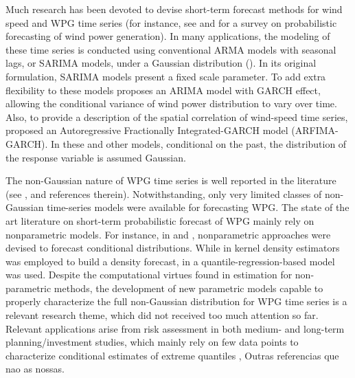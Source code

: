 \documentclass[a4paper]{IEEEtran}
\begin{document}
Much research has been devoted to devise short-term forecast methods for wind speed and WPG time series (for instance, see 
\cite{conradsen1984review, brown1984time, conejo2005forecasting,nielsen2006,pinson2007,taylor2009wind,wang2011review,bessa2012time,sideratos2012probabilistic,wan2016,gallego2016line,Xydas2017,cavalcante2017lasso,wang2017deep} 
and \cite{zhang2014review} for a survey on probabilistic forecasting of wind power generation). In many applications, the modeling of these time series is conducted using conventional ARMA models with seasonal lags, or SARIMA models, under a Gaussian distribution (\cite{FosteringWPP,souto2014high}). In its original formulation, SARIMA models present a fixed scale parameter. To add extra flexibility to these models \cite{lau2010approaches} proposes an ARIMA model with GARCH effect, allowing the conditional variance of wind power distribution to vary over time. Also, to provide a description of the spatial correlation of wind-speed time series, \cite{taylor2009wind} proposed an Autoregressive Fractionally Integrated-GARCH model (ARFIMA-GARCH). In these and other models, conditional on the past, the distribution of the response variable is assumed Gaussian.

The non-Gaussian nature of WPG time series is well reported in the literature (see \cite{bessa2012time,jeon2012using,taylor2015forecasting,Wan2017}, and references therein). Notwithstanding, only very limited classes of non-Gaussian time-series models were available for forecasting WPG. The state of the art literature on short-term probabilistic forecast of WPG mainly rely on nonparametric models. For instance, in \cite{bessa2012time} and \cite{Wan2017}, nonparametric approaches were devised to forecast conditional distributions. While in \cite{bessa2012time}  kernel density estimators was employed to build a density forecast, in \cite{Wan2017} a quantile-regression-based model was used. Despite the computational virtues found in estimation for non-parametric methods, the development of new parametric models capable to properly characterize the full non-Gaussian distribution for WPG time series is a relevant research theme, which did not received too much attention so far. Relevant applications arise from risk assessment in both medium- and long-term planning/investment studies, which mainly rely on few data points to characterize conditional estimates of extreme quantiles \cite{FosteringWPP,SHAPIRO2013,Fanzeres2015,Aderson2017,kariniotakis2017renewable} {\color{red}, Outras referencias que nao as nossas}.
\end{document}
